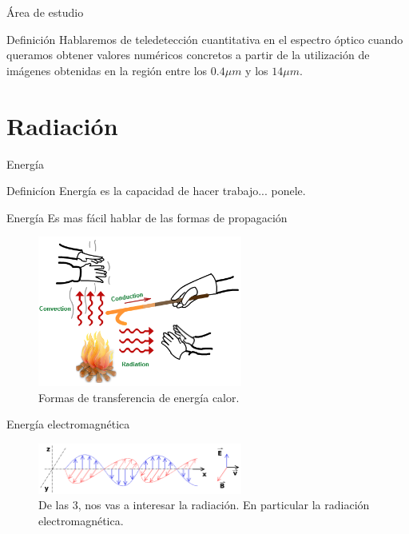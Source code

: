 \documentclass[]{beamer}
\begin{document}
\begin{frame}{Área de estudio}
  \begin{block}{Definición}
    Hablaremos de teledetección cuantitativa en el espectro óptico cuando queramos obtener valores numéricos concretos a partir de la utilización de imágenes obtenidas en la región entre los $0.4\mu m$ y los $14\mu m$.
  \end{block}
\end{frame}

\section{Radiación}
\label{sec:radiacion}
\begin{frame}{Energía}
  \begin{block}{Definicíon}
    Energía es la capacidad de hacer trabajo... \pause ponele.
  \end{block}
\end{frame}

\begin{frame}{Energía}
  Es mas fácil hablar de las formas de propagación
  \begin{figure}
    \includegraphics[width=0.6\textwidth]{imagenes/types-of-heat-transfer.png}
    \caption{Formas de transferencia de energía calor.}
  \end{figure}
\end{frame}


\begin{frame}{Energía electromagnética}
  \begin{figure}
    \includegraphics[width=0.6\textwidth]{imagenes/Onde_electromagnetique.png}
    \caption{De las 3, nos vas a interesar la radiación. En particular la radiación electromagnética.}
  \end{figure}
\end{frame}
\end{document}

